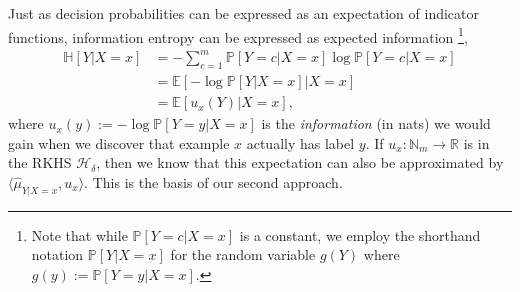 \documentclass{article}
\begin{document}
	Just as decision probabilities can be expressed as an expectation of indicator functions, information entropy can be expressed as expected information \footnote{Note that while $\mathbb{P}[Y = c | X = x]$ is a constant, we employ the shorthand notation $\mathbb{P}[Y| X = x]$ for the random variable $g(Y)$ where $g(y) := \mathbb{P}[Y = y | X = x]$.},
	\begin{equation}
	\begin{aligned}
		\mathbb{H}[Y | X = x] &= - \sum_{c = 1}^{m} \mathbb{P}[Y = c| X = x] \log{\mathbb{P}[Y = c | X = x]} \\
		&= \mathbb{E}[- \log{\mathbb{P}[Y | X = x]} | X = x] \\
		&= \mathbb{E}[u_{x}(Y) | X = x],
	\end{aligned}
	\end{equation}
	where $u_{x}(y) := - \log{\mathbb{P}[Y = y | X = x]}$ is the \textit{information} (in nats) we would gain when we discover that example $x$ actually has label $y$. If $u_{x} : \mathbb{N}_{m} \to \mathbb{R}$ is in the RKHS $\mathcal{H}_{\delta}$, then we know that this expectation can also be approximated by $\langle \hat{\mu}_{Y | X = x}, u_{x} \rangle$. This is the basis of our second approach.
	
\end{document}
